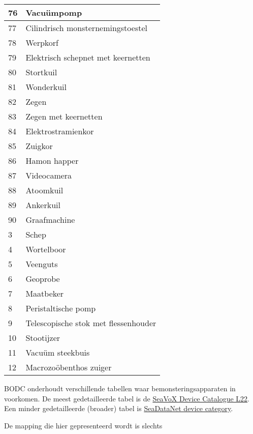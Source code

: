 \documentclass[
]{book}
\begin{document}
\begin{table}
\begin{tabular}[t]{l|l}
\hline
76 & Vacuümpomp\\
\hline
77 & Cilindrisch monsternemingstoestel\\
\hline
78 & Werpkorf\\
\hline
79 & Elektrisch schepnet met keernetten\\
\hline
80 & Stortkuil\\
\hline
81 & Wonderkuil\\
\hline
82 & Zegen\\
\hline
83 & Zegen met keernetten\\
\hline
84 & Elektrostramienkor\\
\hline
85 & Zuigkor\\
\hline
86 & Hamon happer\\
\hline
87 & Videocamera\\
\hline
88 & Atoomkuil\\
\hline
89 & Ankerkuil\\
\hline
90 & Graafmachine\\
\hline
3 & Schep\\
\hline
4 & Wortelboor\\
\hline
5 & Veenguts\\
\hline
6 & Geoprobe\\
\hline
7 & Maatbeker\\
\hline
8 & Peristaltische pomp\\
\hline
9 & Telescopische stok met flessenhouder\\
\hline
10 & Stootijzer\\
\hline
11 & Vacuüm steekbuis\\
\hline
12 & Macrozoöbenthos zuiger\\
\hline
\end{tabular}
\end{table}

BODC onderhoudt verschillende tabellen waar bemonsteringsapparaten in voorkomen. De meest gedetailleerde tabel is de \href{http://vocab.nerc.ac.uk/collection/L22/current/}{SeaVoX Device Catalogue L22}. Een minder gedetailleerde (broader) tabel is \href{http://vocab.nerc.ac.uk/collection/L05/current/}{SeaDataNet device category}.

De mapping die hier gepresenteerd wordt is slechts
\end{document}
